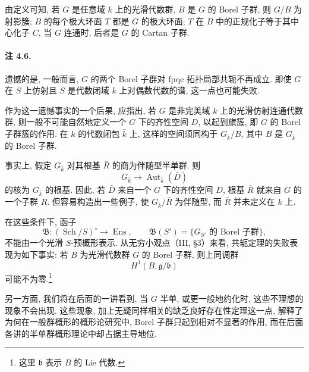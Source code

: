 由定义可知, 若 \(G\) 是任意域 \(k\) 上的光滑代数群, \(B\) 是 \(G\) 的 Borel 子群, 则 \(G/B\) 为射影簇; \(B\) 的每个极大环面 \(T\) 都是 \(G\) 的极大环面; \(T\) 在 \(B\) 中的正规化子等于其中心化子 \(C\), 当 \(G\) 连通时, 后者是 \(G\) 的 Cartan 子群.



\paragraph{\textbf{注 4.6.}}
遗憾的是, 一般而言, \(G\) 的两个 Borel 子群对 fpqc 拓扑局部共轭不再成立. 即使 \(G\) 在 \(S\) 上仿射且 \(S\) 是代数闭域 \(k\) 上对偶数代数的谱, 这一点也可能失败.

作为这一遗憾事实的一个后果, 应指出, 若 \(G\) 是非完美域 \(k\) 上的光滑仿射连通代数群, 则一般不可能自然地定义一个 \(G\) 下的齐性空间 \(D\), 以起到旗簇, 即 \(G\) 的 Borel 子群簇的作用. 在 \(k\) 的代数闭包 \(\bar k\) 上, 这样的空间须同构于 \(G_{\bar k}/B\), 其中 \(B\) 是 \(G_{\bar k}\) 的 Borel 子群.

事实上, 假定 \(G_{\bar k}\) 对其根基 \(\bar R\) 的商为伴随型半单群. 则
\[
  G_{\bar k}\longrightarrow
  \operatorname{Aut}_{\bar k}(\bar D)
\]
的核为 \(G_{\bar k}\) 的根基. 因此, 若 \(\bar D\) 来自一个 \(G\) 下的齐性空间 \(D\), 根基 \(\bar R\) 就来自 \(G\) 的一个子群 \(R\). 但容易构造出一些例子, 使 \(G_{\bar k}/\bar R\) 为伴随型, 而 \(\bar R\) 并未定义在 \(k\) 上.

在这些条件下, 函子
\[
  \mathfrak B\colon(\operatorname{Sch}/S)^\circ
    \longrightarrow \operatorname{Ens},
  \qquad
  \mathfrak B(S')=
  \{G_{S'}\text{ 的 Borel 子群}\},
\]
不能由一个光滑 \(S\)-预概形表示. 从无穷小观点\textup{（III, \S3）}来看, 共轭定理的失败表现为如下事实: 若 \(B\) 为光滑代数群 \(G\) 的 Borel 子群, 则上同调群
\[
  H^1(B,\mathfrak g/\mathfrak b)
\]
可能不为零.\footnote{这里 \(\mathfrak b\) 表示 \(B\) 的 Lie 代数.}

另一方面, 我们将在后面的一讲看到, 当 \(G\) 半单, 或更一般地约化时, 这些不理想的现象不会出现. 这些现象, 加上无疑同样相关的缺乏良好存在性定理这一点, 解释了为何在一般群概形的概形论研究中, Borel 子群只起到相对不显著的作用, 而在后面各讲的半单群概形理论中却占据主导地位.

